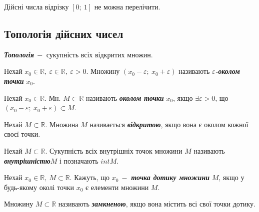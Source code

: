 \begin{theorem}
    Дійсні числа відрізку  $[0; \: 1]$  не можна перелічити.
\end{theorem}

\subsection{\large{Топологія дійсних чисел}}

\begin{definition} 
        \textcolor{NavyBlue}{\textbf{\textit{Топологія}}}$ \: -$ сукупність всіх відкритих множин.
\end{definition}

\begin{definition} 
        Нехай $x_0 \in \mathbb{R},\: \varepsilon \in \mathbb{R}, \: \varepsilon > 0$. Множину $(x_0 - \varepsilon; \: x_0 + \varepsilon)$ називають \textcolor{NavyBlue}{\textbf{\textit{$\varepsilon$-околом точки}}} $x_0$.
\end{definition}

\begin{definition} 
        Нехай $x_0 \in \mathbb{R}$.\; Мн.  $M \subset \mathbb{R}$ називають \textcolor{NavyBlue}{\textbf{\textit{околом точки}}} $x_0$, якщо $\exists \varepsilon > 0$, що $(x_0 - \varepsilon; \: x_0 + \varepsilon) \subset M$.
\end{definition}



\begin{definition} 
       Нехай $M \subset \mathbb{R}$. Множина $M$ називається \textcolor{NavyBlue}{\textbf{\textit{відкритою}}}, якщо вона є околом кожної своєї точки.
\end{definition}

\begin{definition} 
       Нехай $M \subset \mathbb{R}$. Сукупність всіх внутрішніх точок множини $M$ називають \textcolor{NavyBlue}{\textbf{\textit{внутрішністю}}}\;$M$ і позначають $intM$.
\end{definition}

\begin{definition} 
       Нехай $x_0 \in \mathbb{R},\: M \subset \mathbb{R} $. Кажуть, що $x_0 \: -$  \textcolor{NavyBlue}{\textbf{\textit{точка дотику множини}}} $M$, якщо у будь-якому околі точки $x_0$ є елементи множини $M$.
\end{definition}

\begin{definition} 
       Множину $M \subset \mathbb{R}$ називають \textcolor{NavyBlue}{\textbf{\textit{замкненою}}}, якщо вона містить всі свої точки дотику.
\end{definition}


